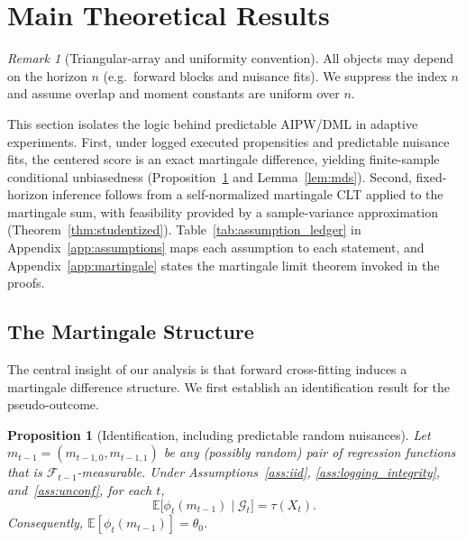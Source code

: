\documentclass[11pt]{article}
\numberwithin{equation}{section}
\theoremstyle{plain}
\newtheorem{proposition}[theorem]{Proposition}
\theoremstyle{definition}
\theoremstyle{remark}
\newtheorem{remark}[theorem]{Remark}
\newcommand{\E}{\mathbb{E}}
\newcommand{\cF}{\mathcal{F}}
\newcommand{\cG}{\mathcal{G}}
\begin{document}
\section{Main Theoretical Results}\label{sec:main_results}

\begin{remark}[Triangular-array and uniformity convention]\label{rem:triangular_uniform}
All objects may depend on the horizon $n$ (e.g.\ forward blocks and nuisance
fits). We suppress the index $n$ and assume overlap and moment constants are
uniform over $n$.
\end{remark}

This section isolates the logic behind predictable AIPW/DML in adaptive experiments. First, under logged executed propensities and predictable nuisance fits, the centered score is an exact martingale difference, yielding finite-sample conditional unbiasedness (Proposition~\ref{prop:identification} and Lemma~\ref{lem:mds}). Second, fixed-horizon inference follows from a self-normalized martingale CLT applied to the martingale sum, with feasibility provided by a sample-variance approximation (Theorem~\ref{thm:studentized}). Table~\ref{tab:assumption_ledger} in Appendix~\ref{app:assumptions} maps each assumption to each statement, and Appendix~\ref{app:martingale} states the martingale limit theorem invoked in the proofs.

\subsection{The Martingale Structure}\label{sec:martingale}

The central insight of our analysis is that forward cross-fitting induces a martingale difference structure. We first establish an identification result for the pseudo-outcome.

\begin{proposition}[Identification, including predictable random nuisances]\label{prop:identification}
Let $m_{t-1}=(m_{t-1,0},m_{t-1,1})$ be any (possibly random) pair of regression functions that is $\cF_{t-1}$-measurable. Under Assumptions~\ref{ass:iid}, \ref{ass:logging_integrity}, and~\ref{ass:unconf}, for each $t$,
\begin{equation}\label{eq:phi_ident}
\E\!\big[\phi_t(m_{t-1})\mid \cG_t\big]=\tau(X_t).
\end{equation}
Consequently, $\E[\phi_t(m_{t-1})]=\theta_0$.
\end{proposition}
\end{document}
